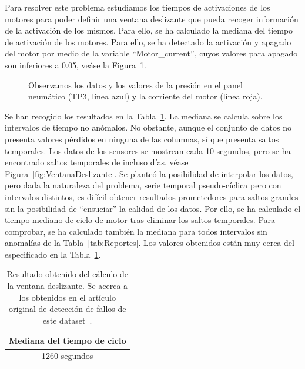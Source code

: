 \documentclass[12pt,letterpaper]{article}
\begin{document}
Para resolver este problema estudiamos los tiempos de activaciones de los motores para poder definir una ventana deslizante que pueda recoger información de la activación de los mismos. 
Para ello, se ha calculado la mediana del tiempo de activación de los motores. Para ello, se ha detectado la activación y apagado del motor por medio de la variable ``Motor\_current'', cuyos 
valores para apagado son inferiores a 0.05, veáse la Figura~\ref{fig:VisualizacionDatos}.

\begin{figure}[htp]
        \centering
        \caption{Observamos los datos y los valores de la presión en el panel neumático (TP3, línea azul) y la corriente del motor (línea roja).}
        \label{fig:VisualizacionDatos}
\end{figure}

Se han recogido los resultados en la Tabla~\ref{tab:TiempoCiclo}. La mediana se calcula sobre los intervalos de tiempo no anómalos. No obstante, 
aunque el conjunto de datos no presenta valores pérdidos en ninguna de las columnas, sí que presenta saltos temporales. Los datos de los sensores se mostrean cada 10 segundos, 
pero se ha encontrado saltos temporales de incluso días, véase Figura~\ref{fig:VentanaDeslizante}. Se planteó la posibilidad de interpolar los datos, pero dada la naturaleza 
del problema, serie temporal pseudo-cíclica pero con intervalos distintos, es difícil obtener resultados prometedores para saltos grandes sin la posibilidad de ``ensuciar'' la calidad de los datos.
Por ello, se ha calculado el tiempo mediano de ciclo de motor tras eliminar los saltos temporales. Para comprobar, se ha calculado también la mediana 
para todos intervalos sin anomalías de la Tabla~\ref{tab:Reportes}. Los valores obtenidos están muy cerca del especificado en la Tabla~\ref{tab:TiempoCiclo}.

\begin{table}[htp]
    \centering
    \begin{tabular}{c}
    \hline
    \textbf{Mediana del tiempo de ciclo} \\ \hline 
    1260 segundos\\
    \hline
    \end{tabular}
    \caption{Resultado obtenido del cálculo de la ventana deslizante. Se acerca a los obtenidos en el artículo original de detección de fallos de este dataset~\cite{FailureDetection}.}
    \label{tab:TiempoCiclo}
\end{table}
\end{document}
